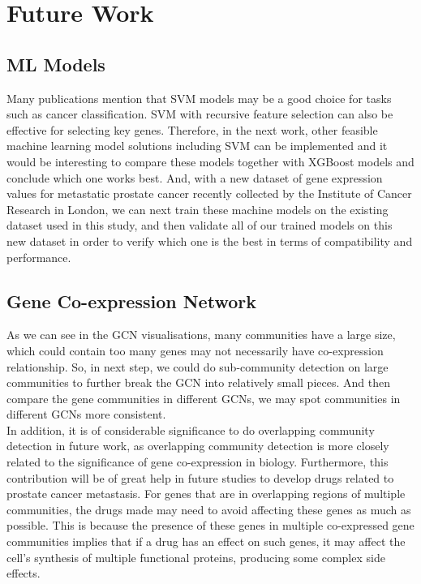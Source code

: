 \documentclass[12pt,a4paper]{report}
\begin{document}
\chapter{Future Work}
\section{ML Models}
Many publications mention that SVM models may be a good choice for tasks such as cancer classification. SVM with recursive feature selection can also be effective for selecting key genes. Therefore, in the next work, other feasible machine learning model solutions including SVM can be implemented and it would be interesting to compare these models together with XGBoost models and conclude which one works best. And, with a new dataset of gene expression values for metastatic prostate cancer recently collected by the Institute of Cancer Research in London, we can next train these machine models on the existing dataset used in this study, and then validate all of our trained models on this new dataset in order to verify which one is the best in terms of compatibility and performance.\\

\section{Gene Co-expression Network}
As we can see in the GCN visualisations, many communities have a large size, which could contain too many genes may not necessarily have co-expression relationship. So, in next step, we could do sub-community detection on large communities to further break the GCN into relatively small pieces. And then compare the gene communities in different GCNs, we may spot communities in different GCNs more consistent. \\

In addition, it is of considerable significance to do overlapping community detection in future work, as overlapping community detection is more closely related to the significance of gene co-expression in biology. Furthermore, this contribution will be of great help in future studies to develop drugs related to prostate cancer metastasis. For genes that are in overlapping regions of multiple communities, the drugs made may need to avoid affecting these genes as much as possible. This is because the presence of these genes in multiple co-expressed gene communities implies that if a drug has an effect on such genes, it may affect the cell's synthesis of multiple functional proteins, producing some complex side effects.
\end{document}

